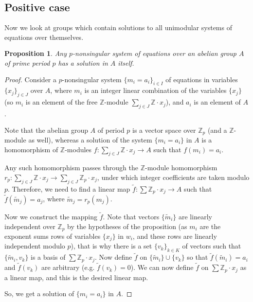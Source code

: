 \documentclass{article}
\newtheorem{prop}{Proposition}
\theoremstyle{definition}
\theoremstyle{remark}
\let\tilde\widetilde
\begin{document}
\subsection{Positive case}

Now we look at groups which contain solutions
to all unimodular systems of equations over themselves.

\begin{prop}\label{pvecgood}
Any 
$p$-nonsingular system of equations
over an abelian group $A$
of prime period $p$ has a solution in $A$ itself.
\end{prop}

\begin{proof}
Consider a $p$-nonsingular system
$\{m_i = a_i\}_{i \in I}$ of equations in variables
$\{x_j\}_{j \in J}$ over $A$,
where $m_i$ is an integer linear combination of the variables $\{x_j\}$
(so $m_i$ is an element of the free $\mathbb Z$-module
$\sum\limits_{j \in J} \mathbb Z \cdot x_j$),
and $a_i$ is an element of $A$.

Note that the abelian group $A$ of period $p$ is a
vector space over $\mathbb Z_p$
(and a $\mathbb Z$-module as well),
whereas a solution of the system $\{m_i=a_i\}$ in $A$ is
a homomorphism of $\mathbb Z$-modules
$f \colon \sum\limits_{j \in J} \mathbb Z \cdot x_j \to A$
such that $f(m_i)=a_i$.

Any such homomorphism passes through the $\mathbb Z$-module homomorphism
$r_p\colon\sum\limits_{j \in J} \mathbb Z \cdot x_j \to \sum\limits_{j \in J}\mathbb Z_p \cdot x_j$,
under which integer coefficients are taken modulo $p$.
Therefore, we need to find a linear map
$\tilde f \colon \sum\mathbb Z_p \cdot x_j \to A$
such that $\tilde f (\tilde m_j) = a_j$,
where $\tilde m_j=r_p(m_j)$.

Now we construct the mapping $\tilde f$. Note that vectors
$\{\tilde m_i\}$ are linearly independent over $\mathbb Z_p$ by the hypotheses of the proposition
(as $m_i$ are the exponent sums rows of variables
$\{x_j\}$ in $w_i$, and these rows are linearly independent
modulo $p$), that is why there is a set
$\{v_k\}_{k \in K}$ of vectors
such that $\{\tilde m_i,v_k\}$ is a basis of
$\sum\mathbb Z_p \cdot x_j$.
Now define $\tilde f$ on
$\{\tilde m_i\}\cup \{v_k\}$ so that
$\tilde f(\tilde m_i)=a_i$ and $\tilde f(v_k)$ are arbitrary
(e.g. $\tilde f(v_k)=0$).
We can now define $\tilde f$ on $\sum\mathbb Z_p \cdot x_j$
as a linear map, and this is the desired linear map.

So, we get a solution of $\{m_i=a_i\}$ in $A$.
\end{proof}
\end{document}
